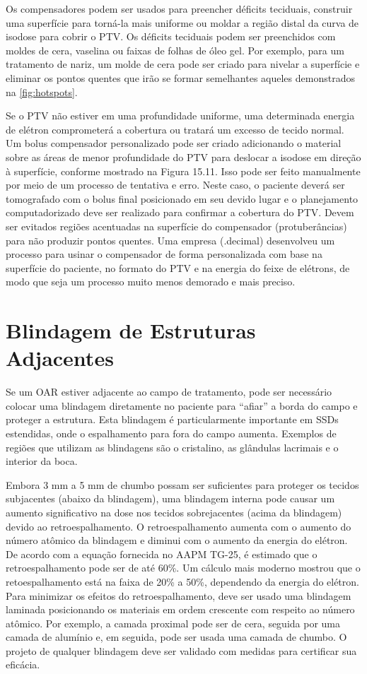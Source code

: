 \documentclass[11pt,a4paper]{article}
\newcounter{exemplo}
\begin{document}
	Os compensadores podem ser usados para preencher déficits teciduais, construir uma superfície para torná-la mais uniforme ou moldar a região distal da curva de isodose para cobrir o PTV. Os déficits teciduais podem ser preenchidos com moldes de cera, vaselina ou faixas de folhas de óleo gel. Por exemplo, para um tratamento de nariz, um molde de cera pode ser criado para nivelar a superfície e eliminar os pontos quentes que irão se formar semelhantes aqueles demonstrados na \ref{fig:hotspots}.

	Se o PTV não estiver em uma profundidade uniforme, uma determinada energia de elétron comprometerá a cobertura ou tratará um excesso de tecido normal. Um  bolus compensador personalizado pode ser criado adicionando o material sobre as áreas de menor profundidade do PTV para deslocar a isodose em direção à superfície, conforme mostrado na Figura 15.11. Isso pode ser feito manualmente por meio de um processo de tentativa e erro. Neste caso, o paciente deverá ser tomografado com o bolus final posicionado em seu devido lugar e o planejamento computadorizado deve ser realizado para confirmar a cobertura do PTV. Devem ser evitados regiões acentuadas na superfície do compensador (protuberâncias) para não produzir pontos quentes. Uma empresa (.decimal) desenvolveu um processo para usinar o compensador de forma personalizada com base na superfície do paciente, no formato do PTV e na energia do feixe de elétrons, de modo que seja um processo muito menos demorado e mais preciso.

\section{Blindagem de Estruturas Adjacentes}

	Se um OAR estiver adjacente ao campo de tratamento, pode ser necessário colocar uma blindagem diretamente no paciente para ``afiar'' a borda do campo e proteger a estrutura. Esta blindagem é particularmente importante em SSDs estendidas, onde o espalhamento para fora do campo aumenta. Exemplos de regiões que utilizam as blindagens são o cristalino, as glândulas lacrimais e o interior da boca.
	
	Embora 3 mm a 5 mm de chumbo possam ser suficientes para proteger os tecidos subjacentes (abaixo da blindagem), uma blindagem interna pode causar um aumento significativo na dose nos tecidos sobrejacentes (acima da blindagem) devido ao retroespalhamento. O retroespalhamento aumenta com o aumento do número atômico da blindagem e diminui com o aumento da energia do elétron. De acordo com a equação fornecida no AAPM TG-25, é estimado que o retroespalhamento pode ser de até 60\%. Um cálculo mais moderno mostrou que o retoespalhamento está na faixa de 20\% a 50\%, dependendo da energia do elétron. Para minimizar os efeitos do retroespalhamento, deve ser usado uma blindagem laminada posicionando os materiais em ordem crescente com respeito ao número atômico. Por exemplo, a camada proximal pode ser de cera, seguida por uma camada de alumínio e, em seguida, pode ser usada uma camada de chumbo. O projeto de qualquer blindagem deve ser validado com medidas para certificar sua eficácia.
\end{document}
